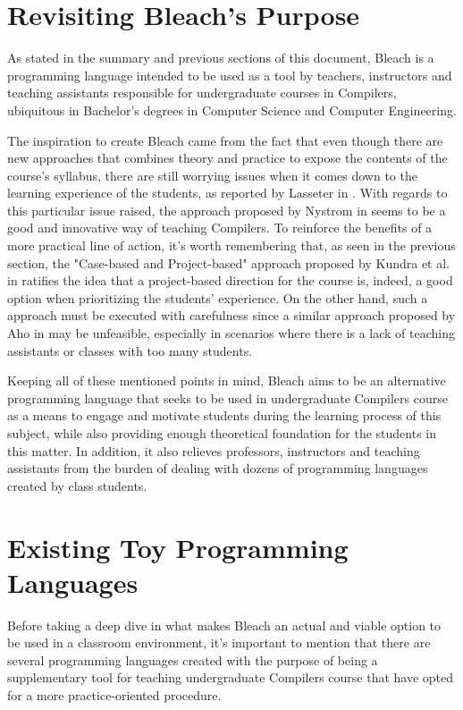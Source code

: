 \section{Revisiting Bleach's Purpose}
As stated in the summary and previous sections of this document, Bleach is a programming language intended to be used as a tool by teachers, instructors and teaching assistants responsible for undergraduate courses in Compilers, ubiquitous in Bachelor's degrees in Computer Science and Computer Engineering.

The inspiration to create Bleach came from the fact that even though there are new approaches that combines theory and practice to expose the contents of the course's syllabus, there are still worrying issues when it comes down to the learning experience of the students, as reported by Lasseter in \cite{lasseter2015interpreter}. With regards to this particular issue raised, the approach proposed by Nystrom in \cite{nystrom2021crafting} seems to be a good and innovative way of teaching Compilers. To reinforce the benefits of a more practical line of action, it's worth remembering that, as seen in the previous section, the "Case-based and Project-based" approach proposed by Kundra et al. in \cite{kundra2016experience} ratifies the idea that a project-based direction for the course is, indeed, a good option when prioritizing the students' experience. On the other hand, such a approach must be executed with carefulness since a similar approach proposed by Aho in \cite{aho2008teaching} may be unfeasible, especially in scenarios where there is a lack of teaching assistants or classes with too many students.

Keeping all of these mentioned points in mind, Bleach aims to be an alternative programming language that seeks to be used in undergraduate Compilers course as a means to engage and motivate students during the learning process of this subject, while also providing enough theoretical foundation for the students in this matter. In addition, it also relieves professors, instructors and teaching assistants from the burden of dealing with dozens of programming languages created by class students.

\section{Existing Toy Programming Languages}

Before taking a deep dive in what makes Bleach an actual and viable option to be used in a classroom environment, it's important to mention that there are several programming languages created with the purpose of being a supplementary tool for teaching undergraduate Compilers course that have opted for a more practice-oriented procedure.

